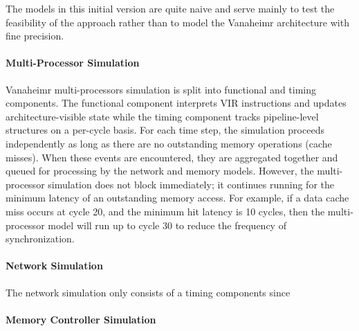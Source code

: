 \documentclass[conference, 10pt]{IEEEtran}
\begin{document}
The models in this initial version are quite naive and serve mainly to test the
feasibility of the approach rather than to model the Vanaheimr architecture with
fine precision.

\paragraph{Multi-Processor Simulation}

Vanaheimr multi-processors simulation is split into functional and timing components.
The functional component interprets VIR instructions and updates architecture-visible
state while the timing component tracks pipeline-level structures on a per-cycle basis.
For each time step, the simulation proceeds independently as long as there are no
outstanding memory operations (cache misses).  When these events are encountered,
they are aggregated together and queued for processing by the network and memory models.
However, the multi-processor simulation does not block immediately; it continues running 
for the minimum latency of an outstanding memory access.  For example, if a data cache
miss occurs at cycle 20, and the minimum hit latency is 10 cycles, then the multi-processor
model will run up to cycle 30 to reduce the frequency of synchronization.  

\paragraph{Network Simulation}

The network simulation only consists of a timing components since  

\paragraph{Memory Controller Simulation}



\end{document}
